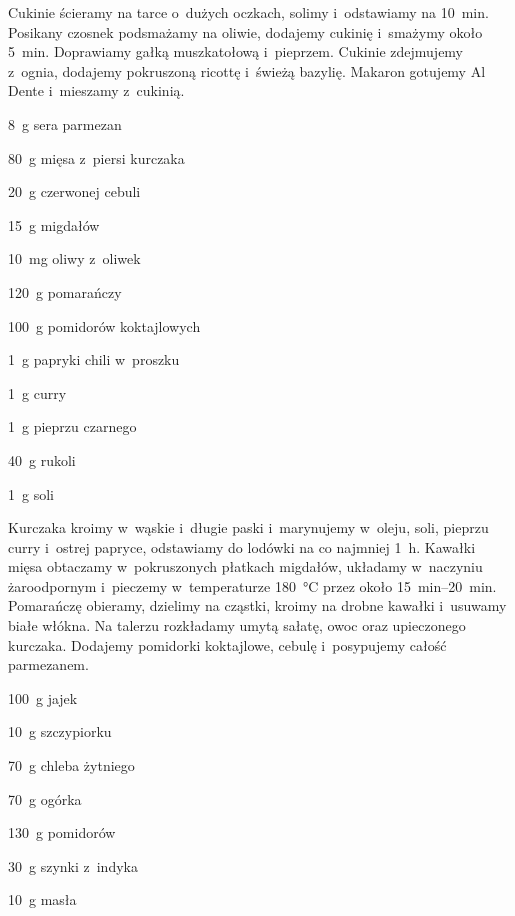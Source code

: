 \documentclass[../main.tex]{subfiles}
\begin{document}
Cukinie ścieramy na tarce o~dużych oczkach, solimy i~odstawiamy na
\qty{10}{\minute}. Posikany czosnek podsmażamy na oliwie, dodajemy cukinię
i~smażymy około \qty{5}{\minute}. Doprawiamy gałką muszkatołową i~pieprzem.
Cukinie zdejmujemy z~ognia, dodajemy pokruszoną ricottę i~świeżą bazylię.
Makaron gotujemy Al Dente i~mieszamy z~cukinią.


\begin{Ingred}
    \item \qty{8}{\gram} sera parmezan
    \item \qty{80}{\gram} mięsa z~piersi kurczaka
    \item \qty{20}{\gram} czerwonej cebuli
    \item \qty{15}{\gram} migdałów
    \item \qty{10}{\milli\gram} oliwy z~oliwek
    \item \qty{120}{\gram} pomarańczy
    \item \qty{100}{\gram} pomidorów koktajlowych
    \item \qty{1}{\gram} papryki chili w~proszku
    \item \qty{1}{\gram} curry
    \item \qty{1}{\gram} pieprzu czarnego
    \item \qty{40}{\gram} rukoli
    \item \qty{1}{\gram} soli
\end{Ingred}

Kurczaka kroimy w~wąskie i~długie paski i~marynujemy w~oleju, soli, pieprzu
curry i~ostrej papryce, odstawiamy do lodówki na co najmniej \qty{1}{\hour}.
Kawałki mięsa obtaczamy w~pokruszonych płatkach migdałów, układamy w~naczyniu
żaroodpornym i~pieczemy w~temperaturze \qty{180}{\celsius} przez około
\qtyrange{15}{20}{\minute}. Pomarańczę obieramy, dzielimy na cząstki, kroimy na
drobne kawałki i~usuwamy białe włókna. Na talerzu rozkładamy umytą sałatę, owoc
oraz upieczonego kurczaka. Dodajemy pomidorki koktajlowe, cebulę i~posypujemy
całość parmezanem.


\begin{Ingred}
    \item \qty{100}{\gram} jajek
    \item \qty{10}{\gram} szczypiorku
    \item \qty{70}{\gram} chleba żytniego
    \item \qty{70}{\gram} ogórka
    \item \qty{130}{\gram} pomidorów
    \item \qty{30}{\gram} szynki z~indyka
    \item \qty{10}{\gram} masła
\end{Ingred}
\end{document}
